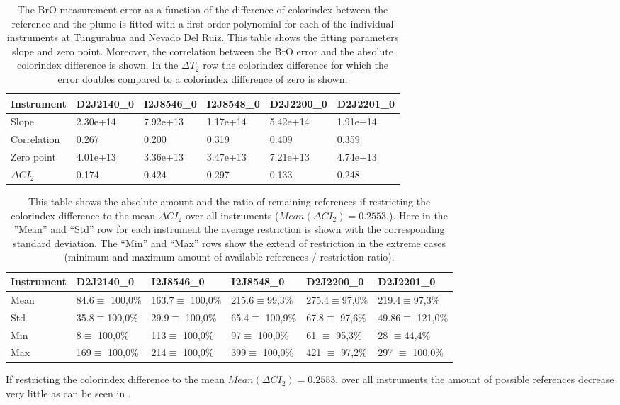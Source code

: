 	\begin{table}[h]
	\begin{tabular}{|p{2cm}|p{2cm}|p{2cm}|p{2cm}|p{2cm}|p{2cm}|}
		Instrument	&D2J2140\_0&I2J8546\_0& I2J8548\_0&D2J2200\_0&D2J2201\_0\\
		\toprule
		Slope&2.30e+14 &7.92e+13 &1.17e+14 &5.42e+14&1.91e+14\\
		\midrule
		Correlation&
		0.267&
		0.200&
		0.319&
		0.409&
		0.359\\
		\midrule
		Zero point&4.01e+13&3.36e+13&3.47e+13& 7.21e+13& 4.74e+13\\
		\midrule
		$\Delta CI_{2}$&0.174&0.424&0.297&0.133&0.248\\
		\bottomrule
	\end{tabular}
	\caption{The BrO measurement error as a function of the difference of colorindex between the reference and the plume is fitted with a first order polynomial for each of the individual instruments at Tungurahua and Nevado Del Ruiz. This table shows the fitting parameters slope and zero point. Moreover, the correlation between the BrO error and the absolute colorindex difference is shown. In the $\Delta T_{2}$ row the colorindex difference for which the error doubles compared to a colorindex difference of zero is shown.}
	\label{tab:colidxcalc}
\end{table}

	\begin{table}[h]
	\begin{tabular}{|p{2cm}|p{2cm}|p{2cm}|p{2cm}|p{2cm}|p{2cm}|}
		Instrument	&D2J2140\_0&I2J8546\_0& I2J8548\_0&D2J2200\_0&D2J2201\_0\\
		\toprule
		Mean&
		84.6$\equiv$ 100,0\% &	163.7$\equiv$ 100,0\%&	215.6$\equiv$99,3\%&
		275.4$\equiv$97,0\% &219.4$\equiv$97,3\% \\
		\midrule
		Std&
		35.8$\equiv$100,0\% &	29.9$\equiv$	100,0\% &
		65.4$\equiv$	100,9\%&
		67.8$\equiv$	97,6\% &
		49.86$\equiv$	121,0\% \\
		\midrule
		Min&
		8$\equiv$	100,0\% &
		113$\equiv$	100,0\% 
		&97$\equiv$	100,0\% 
		&61 $\equiv$	95,3\% 
		&28	$\equiv$44,4\% \\
		\midrule
		Max
		&169$\equiv$	100,0\% 
		&214$\equiv$	100,0\% 
		&399$\equiv$	100,0\% 
		&421 $\equiv$	97,2\% 
		&297 $\equiv$	100,0\%  \\
		\bottomrule
	\end{tabular}
	\caption{This table shows the absolute amount and the ratio of remaining references if restricting the colorindex difference to the mean $\Delta CI_{2}$ over all instruments ($Mean(\Delta CI_{2}) = 0.2553.$). Here in the ”Mean” and “Std” row for each  instrument the average restriction is shown with the corresponding standard deviation. The “Min” and “Max” rows show the extend of restriction in the extreme cases (minimum and maximum amount of available references / restriction ratio).}
	\label{tab:colidxres}
\end{table}	
If restricting the colorindex difference to the mean $Mean(\Delta CI_{2}) = 0.2553.$ over all instruments the amount of possible references decrease very little as can be seen in .\\

